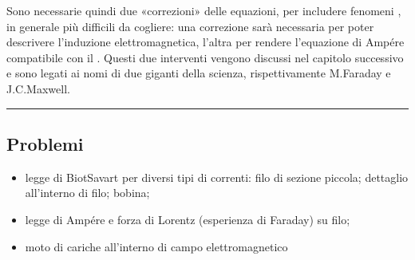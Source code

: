 \documentclass[letterpaper,10pt,italian]{jupyterBook}
\begin{document}
\sphinxAtStartPar
Sono necessarie quindi due «correzioni» delle equazioni, per includere fenomeni , in generale più difficili da cogliere: una correzione sarà necessaria per poter descrivere l’induzione elettromagnetica, l’altra per rendere l’equazione di Ampére compatibile con il . Questi due interventi vengono discussi nel capitolo successivo e sono legati ai nomi di due giganti della scienza, rispettivamente M.Faraday e J.C.Maxwell.


\bigskip\hrule\bigskip


\sphinxstepscope


\subsection{Problemi}
\label{\detokenize{ch/electromagnetism/electromagnetism-steady-problems:problemi}}\label{\detokenize{ch/electromagnetism/electromagnetism-steady-problems:physics-hs-electromagnetism-electromagnetism-steady-problems}}\label{\detokenize{ch/electromagnetism/electromagnetism-steady-problems::doc}}\begin{itemize}
\item {} 
\sphinxAtStartPar
legge di Biot\sphinxhyphen{}Savart per diversi tipi di correnti: filo di sezione piccola; dettaglio all’interno di filo; bobina;

\item {} 
\sphinxAtStartPar
legge di Ampére e forza di Lorentz (esperienza di Faraday) su filo;

\item {} 
\sphinxAtStartPar
moto di cariche all’interno di campo elettromagnetico

\end{itemize}
 \label{exercise:ch/electromagnetism/electromagnetism-steady-problems-exercise-0}
\end{document}
